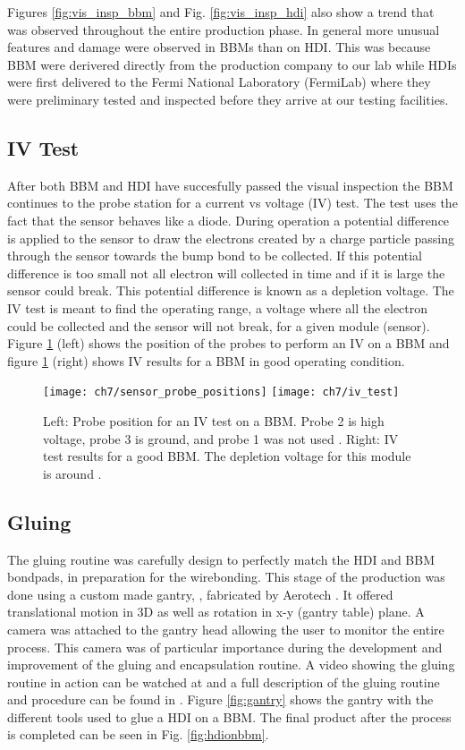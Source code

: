 Figures \ref{fig:vis_insp_bbm} and Fig. \ref{fig:vis_insp_hdi} also show a trend that was observed throughout the entire production phase. In general more unusual features and damage were observed in BBMs than on HDI. This was because BBM were derivered directly from the production company to our lab while HDIs were first delivered to the Fermi National Laboratory (FermiLab) where they were preliminary tested and inspected before they arrive at our testing facilities. 

\subsection{IV Test}\label{ivbbm}
After both BBM and HDI have succesfully passed the visual inspection the BBM continues to the probe station for a current vs voltage (IV) test. The test uses the fact that the sensor behaves like a diode. During operation a potential difference is applied to the sensor to draw the electrons created by a charge particle passing through the sensor towards the bump bond to be collected. If this potential difference is too small not all electron will collected in time and if it is large the sensor could break. This potential difference is known as a depletion voltage. The IV test is meant to find the operating range, a voltage where all the electron could be collected and the sensor will not break, for a given module (sensor). Figure \ref{fig:sensor_probe_positions} (left) shows the position of the probes to perform an IV on a BBM and figure \ref{fig:sensor_probe_positions} (right) shows IV results for a BBM in good operating condition.  

\begin{figure}[!h]
	\centering
	\texttt{[image: ch7/sensor\_probe\_positions]}
	\texttt{[image: ch7/iv\_test]}
	\caption[IV test of BBM]{Left: Probe position for an IV test on a BBM. Probe 2 is high voltage, probe 3 is ground, and probe 1 was not used \cite{ph1_sop}. Right: IV test results for a good BBM. The depletion voltage for this module is around {}.}
	\label{fig:sensor_probe_positions}
\end{figure}

\subsection{Gluing}
The gluing routine was carefully design to perfectly match the HDI and BBM bondpads, in preparation for the wirebonding. This stage of the production was done using a custom made gantry, , fabricated by Aerotech \cite{aerotech}. It offered translational motion in 3D as well as rotation in x-y (gantry table) plane. A camera was attached to the gantry head allowing the user to monitor the entire process. This camera was of particular importance during the development and improvement of the gluing and encapsulation routine. A video showing the gluing routine in action can be watched at \cite{gluing_frank} and a full description of the gluing routine and procedure can be found in \cite{and_the}. Figure \ref{fig:gantry} shows the gantry with the different tools used to glue a HDI on a BBM. The final product after the process is completed can be seen in Fig. \ref{fig:hdionbbm}.


